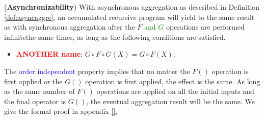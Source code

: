 {\begin{theorem}
	\label{th:async}
	(\textbf{Asynchronizability}) With asynchronous aggregation as described in Definition \ref{def:asyncaggre}, an accumulated recursive program will yield to the same result as with synchronous aggregation after the $F$ \textcolor{green}{and $G$} operations are performed {\color{green}infinite}the same times, as long as the following conditions are satisfied.
	\begin{itemize}
		\item \textbf{\textcolor{red}{ANOTHER name}}: $G\circ F\circ G(X)=G\circ F(X)$;
	\end{itemize}
\end{theorem}
The \textcolor{blue}{order independent} property implies that no matter the $F()$ operation is first applied or the $G()$ operation is first applied, the effect is the same. As long as the same number of $F()$ operations are applied on all the initial inputs and the final operator is $G()$, the eventual aggregation result will be the same.%
We give the formal proof in appendix \ref{},
}
